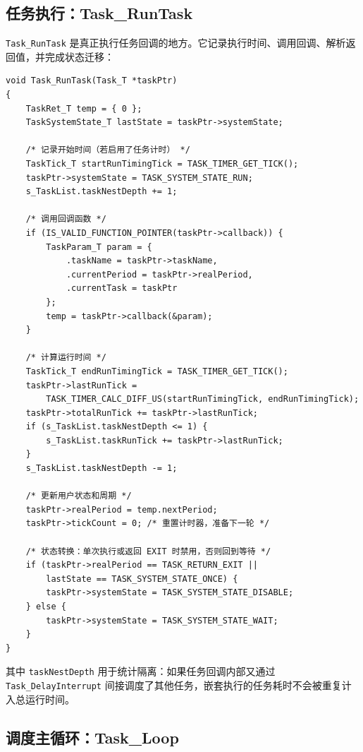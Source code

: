 \subsection{任务执行：Task\_RunTask}

\texttt{Task\_RunTask} 是真正执行任务回调的地方。它记录执行时间、调用回调、解析返回值，并完成状态迁移：

\begin{lstlisting}[style=c]
void Task_RunTask(Task_T *taskPtr)
{
    TaskRet_T temp = { 0 };
    TaskSystemState_T lastState = taskPtr->systemState;

    /* 记录开始时间（若启用了任务计时） */
    TaskTick_T startRunTimingTick = TASK_TIMER_GET_TICK();
    taskPtr->systemState = TASK_SYSTEM_STATE_RUN;
    s_TaskList.taskNestDepth += 1;

    /* 调用回调函数 */
    if (IS_VALID_FUNCTION_POINTER(taskPtr->callback)) {
        TaskParam_T param = {
            .taskName = taskPtr->taskName,
            .currentPeriod = taskPtr->realPeriod,
            .currentTask = taskPtr
        };
        temp = taskPtr->callback(&param);
    }

    /* 计算运行时间 */
    TaskTick_T endRunTimingTick = TASK_TIMER_GET_TICK();
    taskPtr->lastRunTick =
        TASK_TIMER_CALC_DIFF_US(startRunTimingTick, endRunTimingTick);
    taskPtr->totalRunTick += taskPtr->lastRunTick;
    if (s_TaskList.taskNestDepth <= 1) {
        s_TaskList.taskRunTick += taskPtr->lastRunTick;
    }
    s_TaskList.taskNestDepth -= 1;

    /* 更新用户状态和周期 */
    taskPtr->realPeriod = temp.nextPeriod;
    taskPtr->tickCount = 0; /* 重置计时器，准备下一轮 */

    /* 状态转换：单次执行或返回 EXIT 时禁用，否则回到等待 */
    if (taskPtr->realPeriod == TASK_RETURN_EXIT ||
        lastState == TASK_SYSTEM_STATE_ONCE) {
        taskPtr->systemState = TASK_SYSTEM_STATE_DISABLE;
    } else {
        taskPtr->systemState = TASK_SYSTEM_STATE_WAIT;
    }
}
\end{lstlisting}

其中 \texttt{taskNestDepth} 用于统计隔离：如果任务回调内部又通过 \texttt{Task\_DelayInterrupt} 间接调度了其他任务，嵌套执行的任务耗时不会被重复计入总运行时间。

\subsection{调度主循环：Task\_Loop}


